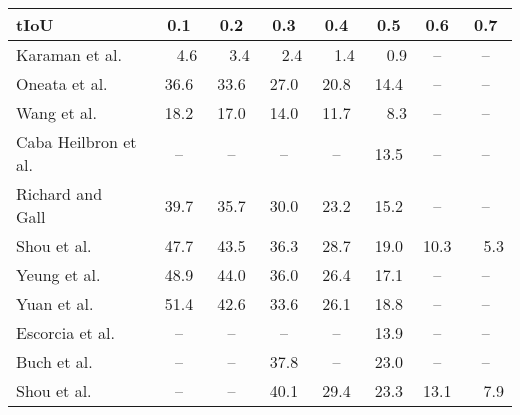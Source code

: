 \documentclass[10pt,twocolumn,letterpaper]{article}
\newcommand\Tstrut{\rule{0pt}{2.2ex}}       \newcommand\Bstrut{\rule[-1.0ex]{0pt}{0pt}} \newcommand{\TBstrut}{\Tstrut\Bstrut}
\begin{document}
\begin{table}[t]
\centering
 \footnotesize
 \setlength{\tabcolsep}{3.96pt}
 \setlength\extrarowheight{1.5pt}
 \begin{tabular}{lccccccc}
  \hline \TBstrut
  tIoU                                                & 0.1           & 0.2           & 0.3           & 0.4           & 0.5           & 0.6           & 0.7           \\
  \hline \Tstrut
  Karaman et al.~\cite{karaman:2014}                  & ~~4.6         & ~~3.4         & ~~2.4         & ~~1.4         & ~~0.9         & --            & --            \\
  Oneata et al.~\cite{oneata:2014}                    & 36.6          & 33.6          & 27.0          & 20.8          & 14.4          & --            & --            \\
  Wang et al.~\cite{wang:2014}                        & 18.2          & 17.0          & 14.0          & 11.7          & ~~8.3         & --            & --            \\
  Caba Heilbron et al.~\cite{caba_heilbron:cvpr2016}  & --            & --            & --            & --            & 13.5          & --            & --            \\ Richard and Gall~\cite{richard:cvpr2016}            & 39.7          & 35.7          & 30.0          & 23.2          & 15.2          & --            & --            \\
  Shou et al.~\cite{shou:cvpr2016}                    & 47.7          & 43.5          & 36.3          & 28.7          & 19.0          & 10.3          & ~~5.3         \\
  Yeung et al.~\cite{yeung:cvpr2016}                  & 48.9          & 44.0          & 36.0          & 26.4          & 17.1          & --            & --            \\
  Yuan et al.~\cite{yuan:cvpr2016}                    & 51.4          & 42.6          & 33.6          & 26.1          & 18.8          & --            & --            \\
  Escorcia et al.~\cite{escorcia:eccv2016}            & --            & --            & --            & --            & 13.9          & --            & --            \\
  Buch et al.~\cite{buch:cvpr2017}                    & --            & --            & 37.8          & --            & 23.0          & --            & --            \\
  Shou et al.~\cite{shou:cvpr2017}                    & --            & --            & 40.1          & 29.4          & 23.3          & 13.1          & ~~7.9         \\

\end{tabular}
\end{table}
\end{document}
